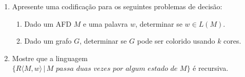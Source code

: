 \documentclass[a4paper]{article}
\theoremstyle{definition}
\begin{document}
  \begin{enumerate}
     \item Apresente uma codificação para os seguintes problemas de decisão:
       \begin{enumerate}
         \item Dado um AFD $M$ e uma palavra $w$, determinar se $w \in L(M)$.
         \item Dado um grafo $G$, determinar se $G$ pode ser colorido usando $k$
           cores.
       \end{enumerate}
      \item Mostre que a linguagem $\{R\langle M,w \rangle\,|\,M\textit{ passa
          duas vezes por algum estado de }M\}$ é recursiva.  
  \end{enumerate}
\end{document}
